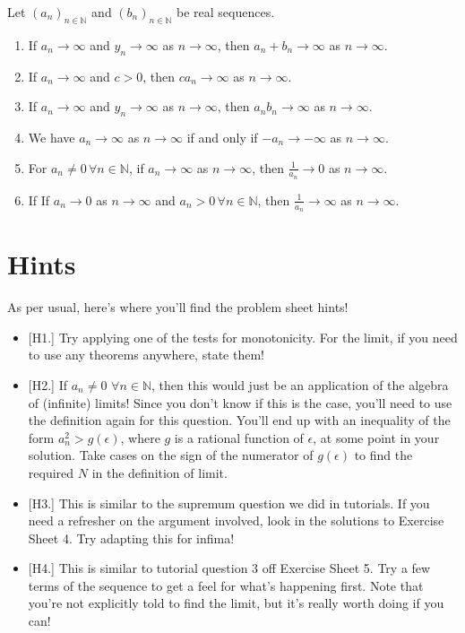 \documentclass[
  12pt,
  a4paper]{extarticle}
\providecommand{\tightlist}{%
  \setlength{\itemsep}{0pt}\setlength{\parskip}{0pt}}
\theoremstyle{plain}
\theoremstyle{plain}
\theoremstyle{plain}
\theoremstyle{plain}
\theoremstyle{plain}
\theoremstyle{definition}
\theoremstyle{definition}
\theoremstyle{definition}
\theoremstyle{remark}
\let\BeginKnitrBlock\begin \let\EndKnitrBlock\end
\renewcommand{\;}{\,}
\begin{document}
\BeginKnitrBlock{theorem}[Algebra of Infinite Limits]
{\label{thm:thm4} }Let \((a_n)_{n\in\mathbb{N}}\) and \((b_n)_{n\in\mathbb{N}}\) be real sequences.

\begin{enumerate}
\def\labelenumi{\arabic{enumi}.}
\tightlist
\item
  If \(a_n \to \infty\) and \(y_n \to \infty\) as \(n \to \infty\), then \(a_n + b_n \to \infty\) as \(n\to\infty\).
\item
  If \(a_n \to \infty\) and \(c > 0\), then \(ca_n \to \infty\) as \(n \to \infty\).
\item
  If \(a_n \to \infty\) and \(y_n \to \infty\) as \(n \to \infty\), then \(a_nb_n \to \infty\) as \(n\to\infty\).
\item
  We have \(a_n \to \infty\) as \(n \to \infty\) if and only if \(-a_n \to -\infty\) as \(n \to \infty\).
\item
  For \(a_n \neq 0\; \forall n \in \mathbb{N}\), if \(a_n \to \infty\) as \(n \to \infty\), then \(\frac{1}{a_n} \to 0\) as \(n \to \infty\).
\item
  If If \(a_n \to 0\) as \(n\to\infty\) and \(a_n > 0\; \forall n \in \mathbb{N}\), then \(\frac{1}{a_n} \to \infty\) as \(n \to \infty\).
\end{enumerate}
\EndKnitrBlock{theorem}

\hypertarget{hints}{%
\section{Hints}\label{hints}}

As per usual, here's where you'll find the problem sheet hints!

\begin{itemize}
\tightlist
\item
  {[}H1.{]} Try applying one of the tests for monotonicity. For the limit, if you need to use any theorems anywhere, state them!
\item
  {[}H2.{]} If \(a_n \neq 0 \, \; \forall n \in \mathbb{N}\), then this would just be an application of the algebra of (infinite) limits! Since you don't know if this is the case, you'll need to use the definition again for this question. You'll end up with an inequality of the form \(a_n^2 > g(\epsilon)\), where \(g\) is a rational function of \(\epsilon\), at some point in your solution. Take cases on the sign of the numerator of \(g(\epsilon)\) to find the required \(N\) in the definition of limit.
\item
  {[}H3.{]} This is similar to the supremum question we did in tutorials. If you need a refresher on the argument involved, look in the solutions to Exercise Sheet 4. Try adapting this for infima!
\item
  {[}H4.{]} This is similar to tutorial question 3 off Exercise Sheet 5. Try a few terms of the sequence to get a feel for what's happening first. Note that you're not explicitly told to find the limit, but it's really worth doing if you can!
\end{itemize}
\end{document}
